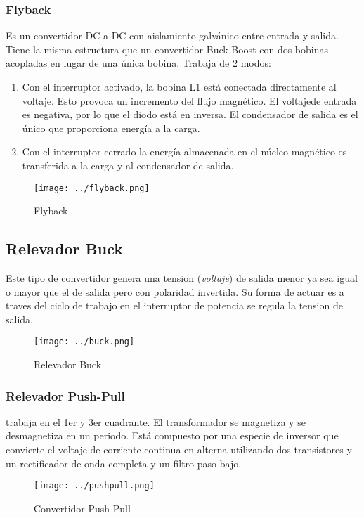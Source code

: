 \documentclass[11pt,a4paper]{article}
\begin{document}
\subsubsection{Flyback}
Es un convertidor DC a DC con aislamiento galvánico entre entrada y salida. Tiene la misma estructura que un convertidor Buck-Boost con dos bobinas acopladas en lugar de una única bobina. Trabaja de 2 modos:\begin{enumerate}
\item Con el interruptor activado, la bobina L1 está conectada directamente al voltaje. Esto provoca un incremento del flujo magnético. El voltajede entrada es negativa, por lo que el diodo está en inversa. El condensador de salida es el único que proporciona energía a la carga.
\item Con el interruptor cerrado la energía almacenada en el núcleo magnético es transferida a la carga y al condensador de salida.
\end{enumerate}

\begin{figure}[h]
\centering
\texttt{[image: ../flyback.png]} 
\caption{Flyback} 
\end{figure}

\subsection{Relevador Buck}
Este tipo de convertidor genera una tension (\emph{voltaje}) de salida menor ya sea igual o mayor que el de salida pero con polaridad invertida. Su forma de actuar es a traves del ciclo de trabajo en el interruptor de potencia se regula la tension de salida. 
 
\begin{figure}[h]
\centering
\texttt{[image: ../buck.png]}   
\caption{Relevador Buck} 
\end{figure}

\subsubsection{Relevador Push-Pull}
trabaja en el 1er y 3er cuadrante. El transformador se magnetiza y se desmagnetiza en un periodo. Está compuesto por una especie de inversor que convierte el voltaje de corriente continua en alterna utilizando dos transistores y un rectificador de onda completa y un filtro paso bajo.

\begin{figure}[h]
\centering
\texttt{[image: ../pushpull.png]}    
\caption{Convertidor Push-Pull} 
\end{figure}
\end{document}
